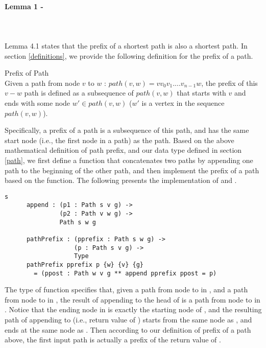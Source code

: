 \paragraph{Lemma 1 - } \label{lemma1V}
\tab\\\\
Lemma 4.1 states that the prefix of a shortest path is also a shortest path. In section \ref{definitions}, we provide the following definition for the prefix of a path.
\begin{definition}{Prefix of Path}\\
Given a path from node $v$ to $w$ : $path(v, w) = vv_0v_1....v_{n-1}w$, the prefix of this $v-w$ path is defined as a subsequence of $path(v, w)$ that starts with $v$ and ends with some node $w' \in path(v, w)$ ($w'$ is a vertex in the sequence $path(v, w)$). 
\end{definition}

Specifically, a prefix of a path is a subsequence of this path, and has the same start node (i.e., the first node in a path) as the path. Based on the above mathematical definition of path prefix, and our  data type defined in section \ref{path}, we first define a  function that concatenates two paths by appending one path to the beginning of the other path, and then implement the prefix of a path based on the  function. The following presents the implementation of  and . 
\begin{lstlisting}s
      append : (p1 : Path s v g) ->
               (p2 : Path v w g) ->
               Path s w g

      pathPrefix : (pprefix : Path s w g) ->
                   (p : Path s v g) ->
                   Type
      pathPrefix pprefix p {w} {v} {g} 
      	= (ppost : Path w v g ** append pprefix ppost = p)
\end{lstlisting}
 
The type of  function specifies that, given a path  from node  to  in , and a path  from node  to  in , the result of appending  to the head of  is a path from node  to  in . Notice that the ending node  in  is exactly the starting node of , and the resulting path of appending  to  (i.e., return value of ) starts from the same node as , and ends at the same node as . Then according to our definition of prefix of a path above, the first input path  is actually a prefix of the return value of . 
\\

